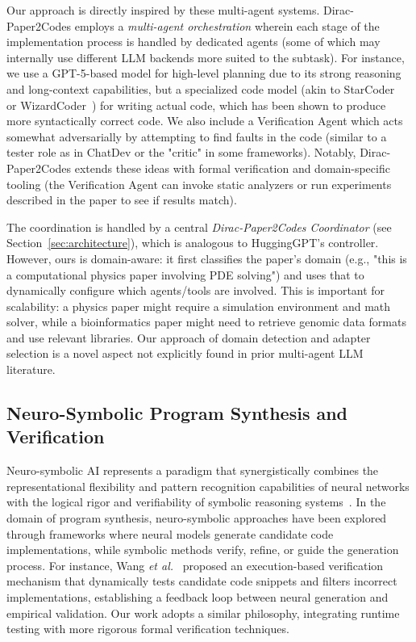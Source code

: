 \documentclass{ieeeaccess}
\begin{document}
Our approach is directly inspired by these multi-agent systems. Dirac-Paper2Codes employs a \textit{multi-agent orchestration} wherein each stage of the implementation process is handled by dedicated agents (some of which may internally use different LLM backends more suited to the subtask). For instance, we use a GPT-5-based model for high-level planning due to its strong reasoning and long-context capabilities, but a specialized code model (akin to StarCoder~\cite{li2023starcoder} or WizardCoder~\cite{luo2023wizardcoder}) for writing actual code, which has been shown to produce more syntactically correct code. We also include a Verification Agent which acts somewhat adversarially by attempting to find faults in the code (similar to a tester role as in ChatDev or the "critic" in some frameworks). Notably, Dirac-Paper2Codes extends these ideas with formal verification and domain-specific tooling (the Verification Agent can invoke static analyzers or run experiments described in the paper to see if results match).

The coordination is handled by a central \textit{Dirac-Paper2Codes Coordinator} (see Section~\ref{sec:architecture}), which is analogous to HuggingGPT's controller. However, ours is domain-aware: it first classifies the paper's domain (e.g., "this is a computational physics paper involving PDE solving") and uses that to dynamically configure which agents/tools are involved. This is important for scalability: a physics paper might require a simulation environment and math solver, while a bioinformatics paper might need to retrieve genomic data formats and use relevant libraries. Our approach of domain detection and adapter selection is a novel aspect not explicitly found in prior multi-agent LLM literature.

\subsection{Neuro-Symbolic Program Synthesis and Verification}
Neuro-symbolic AI represents a paradigm that synergistically combines the representational flexibility and pattern recognition capabilities of neural networks with the logical rigor and verifiability of symbolic reasoning systems~\cite{garcez2022neurosymbolic}. In the domain of program synthesis, neuro-symbolic approaches have been explored through frameworks where neural models generate candidate code implementations, while symbolic methods verify, refine, or guide the generation process. For instance, Wang \emph{et al.}~\cite{wang2024execution} proposed an execution-based verification mechanism that dynamically tests candidate code snippets and filters incorrect implementations, establishing a feedback loop between neural generation and empirical validation. Our work adopts a similar philosophy, integrating runtime testing with more rigorous formal verification techniques.
\end{document}
